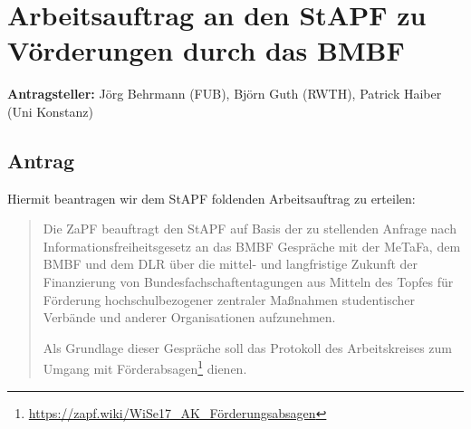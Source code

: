 \documentclass[draft,10pt,oneside]{scrartcl}
\begin{document}
\section*{Arbeitsauftrag an den StAPF zu Vörderungen durch das BMBF}

\textbf{Antragsteller:} Jörg Behrmann (FUB), Björn Guth (RWTH), Patrick Haiber
(Uni Konstanz)

\subsection*{Antrag}

Hiermit beantragen wir dem StAPF foldenden Arbeitsauftrag zu erteilen:

\begin{quote}
	Die ZaPF beauftragt den StAPF auf Basis der zu stellenden Anfrage nach
	Informationsfreiheitsgesetz an das BMBF Gespräche mit der MeTaFa, dem BMBF
	und dem DLR über die mittel- und langfristige Zukunft der Finanzierung von
	Bundesfachschaftentagungen aus Mitteln des Topfes für \glqq{}Förderung
	hochschulbezogener zentraler Maßnahmen studentischer Verbände und anderer
	Organisationen\grqq{} aufzunehmen.

	Als Grundlage dieser Gespräche soll das Protokoll des Arbeitskreises zum
	Umgang mit Förderabsagen\footnote{\href{https://zapf.wiki/WiSe17_AK_Förderungsabsagen}{\url{https://zapf.wiki/WiSe17_AK_Förderungsabsagen}}}
	dienen.
\end{quote}
\end{document}
